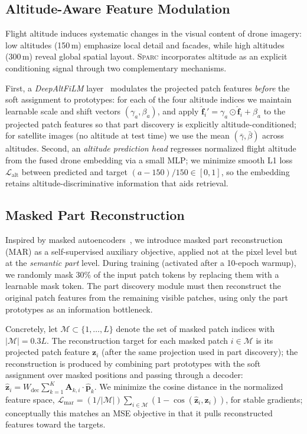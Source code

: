 \documentclass[sigconf, anonymous, review]{acmart}
\newcommand{\ours}{\textsc{Sparc}}
\newcommand{\loss}{\mathcal{L}}
\begin{document}
\subsection{Altitude-Aware Feature Modulation}
\label{sec:altitude}

Flight altitude induces systematic changes in the visual content of drone imagery: low altitudes (150\,m) emphasize local detail and facades, while high altitudes (300\,m) reveal global spatial layout.
\ours{} incorporates altitude as an explicit conditioning signal through two complementary mechanisms.

First, a \emph{DeepAltFiLM} layer~\cite{perez2018film} modulates the projected patch features \emph{before} the soft assignment to prototypes: for each of the four altitude indices we maintain learnable scale and shift vectors $(\gamma_a, \beta_a)$, and apply $\hat{\mathbf{f}}_i' = \gamma_a \odot \hat{\mathbf{f}}_i + \beta_a$ to the projected patch features so that part discovery is explicitly altitude-conditioned; for satellite images (no altitude at test time) we use the mean $(\bar{\gamma}, \bar{\beta})$ across altitudes.
Second, an \emph{altitude prediction head} regresses normalized flight altitude from the fused drone embedding via a small MLP; we minimize smooth L1 loss $\loss_\text{alt}$ between predicted and target $(a - 150)/150 \in [0,1]$, so the embedding retains altitude-discriminative information that aids retrieval.

\subsection{Masked Part Reconstruction}
\label{sec:mar}

Inspired by masked autoencoders~\cite{he2022mae}, we introduce masked part reconstruction (MAR) as a self-supervised auxiliary objective, applied not at the pixel level but at the \emph{semantic part} level.
During training (activated after a 10-epoch warmup), we randomly mask 30\% of the input patch tokens by replacing them with a learnable mask token.
The part discovery module must then reconstruct the original patch features from the remaining visible patches, using only the part prototypes as an information bottleneck.

Concretely, let $\mathcal{M} \subset \{1, \ldots, L\}$ denote the set of masked patch indices with $|\mathcal{M}| = 0.3L$.
The reconstruction target for each masked patch $i \in \mathcal{M}$ is its projected patch feature $\mathbf{z}_i$ (after the same projection used in part discovery); the reconstruction is produced by combining part prototypes with the soft assignment over masked positions and passing through a decoder: $\hat{\mathbf{z}}_i = W_\text{dec} \sum_{k=1}^K \mathbf{A}_{k,i} \cdot \hat{\mathbf{p}}_k$.
We minimize the cosine distance in the normalized feature space, $\loss_\text{mar} = (1/|\mathcal{M}|)\sum_{i \in \mathcal{M}} (1 - \cos(\hat{\mathbf{z}}_i, \mathbf{z}_i))$, for stable gradients; conceptually this matches an MSE objective in that it pulls reconstructed features toward the targets.
\end{document}
